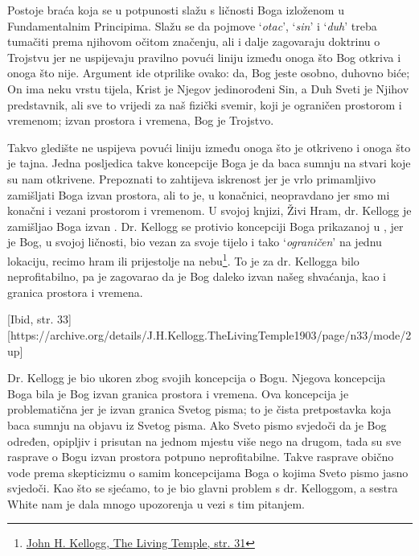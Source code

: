 Postoje braća koja se u potpunosti slažu s ličnosti Boga izloženom u Fundamentalnim Principima. Slažu se da pojmove ‘\textit{otac}’, ‘\textit{sin}’ i ‘\textit{duh}’ treba tumačiti prema njihovom očitom značenju, ali i dalje zagovaraju doktrinu o Trojstvu jer ne uspijevaju pravilno povući liniju između onoga što Bog otkriva i onoga što nije. Argument ide otprilike ovako: da, Bog jeste osobno, duhovno biće; On ima neku vrstu tijela, Krist je Njegov jedinorođeni Sin, a Duh Sveti je Njihov predstavnik, ali sve to vrijedi za naš fizički svemir, koji je ograničen prostorom i vremenom; izvan prostora i vremena, Bog je Trojstvo.

Takvo gledište ne uspijeva povući liniju između onoga što je otkriveno i onoga što je tajna. Jedna posljedica takve koncepcije Boga je da baca sumnju na stvari koje su nam otkrivene. Prepoznati to zahtijeva iskrenost jer je vrlo primamljivo zamišljati Boga izvan prostora, ali to je, u konačnici, neopravdano jer smo mi konačni i vezani prostorom i vremenom. U svojoj knjizi, Živi Hram, dr. Kellogg je zamišljao Boga izvan . Dr. Kellogg se protivio koncepciji Boga prikazanoj u , jer je Bog, u svojoj ličnosti, bio vezan za svoje tijelo i tako ‘\textit{ograničen}’ na jednu lokaciju, recimo hram ili prijestolje na nebu\footnote{\href{https://archive.org/details/J.H.Kellogg.TheLivingTemple1903/page/n31/mode/2up}{John H. Kellogg, The Living Temple, str. 31}}. To je za dr. Kellogga bilo neprofitabilno, pa je zagovarao da je Bog daleko izvan našeg shvaćanja, kao i granica prostora i vremena.

[Ibid, str. 33][https://archive.org/details/J.H.Kellogg.TheLivingTemple1903/page/n33/mode/2up]

Dr. Kellogg je bio ukoren zbog svojih koncepcija o Bogu. Njegova koncepcija Boga bila je Bog izvan granica prostora i vremena. Ova koncepcija je problematična jer je izvan granica Svetog pisma; to je čista pretpostavka koja baca sumnju na objavu iz Svetog pisma. Ako Sveto pismo svjedoči da je Bog određen, opipljiv i prisutan na jednom mjestu više nego na drugom, tada su sve rasprave o Bogu izvan prostora potpuno neprofitabilne. Takve rasprave obično vode prema skepticizmu o samim koncepcijama Boga o kojima Sveto pismo jasno svjedoči. Kao što se sjećamo, to je bio glavni problem s dr. Kelloggom, a sestra White nam je dala mnogo upozorenja u vezi s tim pitanjem.

